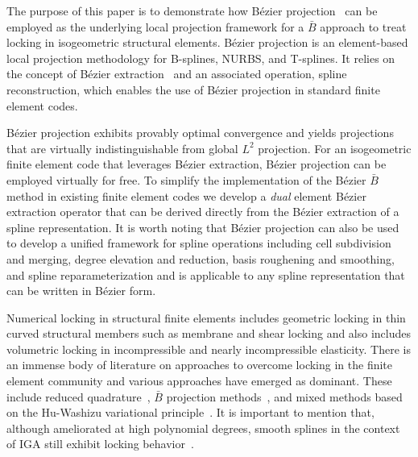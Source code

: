 \documentclass{article}
\newcommand{\Bezier}{{B\'{e}zier} }
\begin{document}
The purpose of this paper is to demonstrate how B\'{e}zier projection~\cite{thomas_bezier_2015} can be employed as the underlying local projection framework for a $\bar{B}$ approach to treat locking in isogeometric structural elements. B\'ezier projection is an element-based local projection methodology for B-splines, NURBS, and T-splines. It relies on the concept of B\'ezier extraction~\cite{borden_isogeometric_2011, scott_isogeometric_2011} and an associated operation, spline reconstruction, which enables the use of B\'ezier projection in standard finite element codes.

B\'ezier projection exhibits provably optimal convergence and yields
projections that are virtually indistinguishable from global $L^2$ projection. For an isogeometric finite element code that leverages B\'ezier extraction, B\'ezier projection can be employed virtually for free. To simplify the implementation of the \Bezier $\bar{B}$ method in existing finite element codes we develop a \textit{dual} element \Bezier extraction operator that can be derived directly from the \Bezier extraction of a spline representation. It is worth noting that B\'ezier projection can also be used to develop a unified framework for spline operations including cell subdivision and merging, degree elevation and reduction, basis roughening and smoothing, and spline reparameterization and is applicable to any spline representation that can be written in B\'ezier form.

Numerical locking in structural finite elements includes geometric locking in thin curved structural members such as membrane and shear locking and also includes volumetric locking in incompressible and nearly incompressible elasticity. There is an immense body of literature on approaches to overcome locking in the finite element community and various approaches have emerged as dominant. These include reduced quadrature~\cite{malkus_mixed_1978,zienkiewicz_reduced_1971}, $\bar{B}$ projection methods~\cite{nagtegaal_numerically_1974,hughes_generalization_1980, NME:NME4328}, and mixed methods based on the Hu-Washizu variational principle~\cite{dolbow_volumetric_1999,kasper_mixed-enhanced_2000,hughes_variational_1986, NME:NME3048}. It is important to mention that, although ameliorated at high polynomial degrees, smooth splines in the context of IGA still exhibit locking behavior~\cite{echter_numerical_2010, bouclier_locking_2012}.
\end{document}
